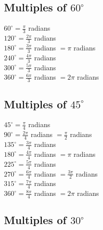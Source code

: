 \documentclass[12pt]{article}
\begin{document}
\subsection*{Multiples of $60^\circ$}


\begin{multicols}{2}

$60^\circ=\frac{\pi}{3}$ radians \\
 
$120^\circ=\frac{2\pi}{3}$ radians \\
  
$180^\circ=\frac{3\pi}{3}$ radians $=\pi$ radians \\
   
$240^\circ=\frac{4\pi}{3}$ radians \\
    
$300^\circ=\frac{5\pi}{3}$ radians \\
     
$360^\circ=\frac{6\pi}{3}$ radians $=2\pi$ radians \\

\end{multicols}

\subsection*{Multiples of $45^\circ$}


\begin{multicols}{2}
$45^\circ=\frac{\pi}{4}$ radians \\

$90^\circ=\frac{2\pi}{4}$ radians $=\frac{\pi}{2}$ radians \\

$135^\circ=\frac{3\pi}{4}$ radians \\

$180^\circ=\frac{4\pi}{4}$ radians $=\pi$ radians \\

$225^\circ=\frac{5\pi}{4}$ radians \\

$270^\circ=\frac{6\pi}{4}$ radians $=\frac{3\pi}{2}$ radians \\

$315^\circ=\frac{7\pi}{4}$ radians \\

$360^\circ=\frac{8\pi}{4}$ radians $=2\pi$ radians \\
\end{multicols}

\subsection*{Multiples of $30^\circ$}
\end{document}
